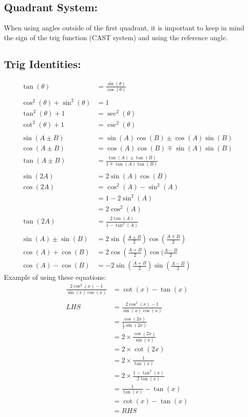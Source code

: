 \documentclass[a5paper]{article}
\begin{document}
	\subsection{Quadrant System:}
	When using angles outside of the first quadrant, it is important to keep in mind the sign of the trig function (CAST system) and using the reference angle.

	\subsection{Trig Identities:}
	\begin{align*}
		\tan(\theta)&=\frac{\sin(\theta)}{\cos(\theta)}\\\\
		\cos^{2}(\theta)+\sin^{2}(\theta)&=1\\
		\tan^{2}(\theta)+1&=\sec^{2}(\theta)\\
		\cot^{2}(\theta)+1&=\csc^{2}(\theta)\\\\
		\sin(A\pm B)&=\sin(A)\cos(B)\pm\cos(A)\sin(B)\\
		\cos(A\pm B)&=\cos(A)\cos(B)\mp\sin(A)\sin(B)\\
		\tan(A\pm B)&=\frac{\tan(A)\pm\tan(B)}{1\mp\tan(A)\tan(B)}\\\\
		\sin(2A)&=2\sin(A)\cos(B)\\
		\cos(2A)&=\cos^{2}(A)-\sin^{2}(A)\\
			&=1-2\sin^{2}(A)\\
			&=2\cos^{2}(A)\\
		\tan(2A)&=\frac{2\tan(A)}{1-\tan^{2}(A)}\\\\
		\sin(A)\pm\sin(B)&=2\sin(\frac{A\pm B}{2})\cos(\frac{A\mp B}{2})\\
		\cos(A)+\cos(B)&=2\cos(\frac{A+B}{2})\cos(\frac{A-B}{2}\\
		\cos(A)-\cos(B)&=-2\sin(\frac{A+B}{2})\sin(\frac{A-B}{2})
	\end{align*}
	Example of using these equations:
	\begin{align*}
		\frac{2\cos^{2}(x)-1}{\sin(x)\cos(x)}&=\cot(x)-\tan(x)\\\\
		LHS&=\frac{2\cos^{2}(x)-1}{\sin(x)\cos(x)}\\
		   &=\frac{\cos(2x)}{\frac{1}{2}\sin(2x)}\\
		   &=2\times\frac{\cos(2x)}{\sin(x)}\\
		   &=2\times\cot(2x)\\
		   &=2\times\frac{1}{\tan(x)}\\
		   &=2\times\frac{1-\tan^{2}(x)}{2\tan(x)}\\
		   &=\frac{1}{\tan(x)}-\tan(x)\\
		   &=\cot(x)-\tan(x)\\
		   &=RHS
	\end{align*}
\end{document}
